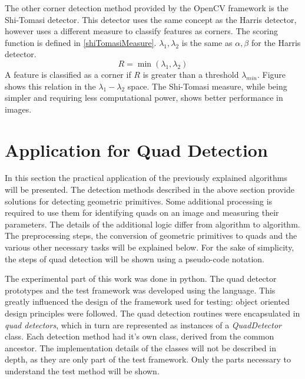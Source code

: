 The other corner detection method provided by the OpenCV framework is the Shi-Tomasi detector\cite{Shi94goodfeatures}.
This detector uses the same concept as the Harris detector, however uses a different measure to classify features as corners.
The scoring function is defined in \eqref{shiTomasiMeasure}. $\lambda_1, \lambda_2$ is the same as $\alpha, \beta$ for the Harris detector.
\begin{equation}
	R = \min(\lambda_1, \lambda_2)
	\label{eq:shiTomasiMeasure}
\end{equation}
A feature is classified as a corner if $R$ is greater than a threshold $\lambda_{min}$.
Figure  shows this relation in the $\lambda_1-\lambda_2$ space.
The Shi-Tomasi measure, while being simpler and requiring less computational power, shows better performance in images\cite{Shi94goodfeatures}.

\section{Application for Quad Detection}

In this section the practical application of the previously explained algorithms will be presented.
The detection methods described in the above section provide solutions for detecting geometric primitives.
Some additional processing is required to use them for identifying quads on an image and measuring their parameters.
The details of the additional logic differ from algorithm to algorithm.
The preprocessing steps, the conversion of geometric primitives to quads and the various other necessary tasks will be explained below.
For the sake of simplicity, the steps of quad detection will be shown using a pseudo-code notation.

The experimental part of this work was done in python.
The quad detector prototypes and the test framework was developed using the language.
This greatly influenced the design of the framework used for testing: object oriented design principles were followed.
The quad detection routines were encapsulated in \textit{quad detectors}, which in turn are represented as instances of a \textit{QuadDetector} class.
Each detection method had it's own class, derived from the common ancestor.
The implementation details of the classes will not be described in depth, as they are only part of the test framework.
Only the parts necessary to understand the test method will be shown.

